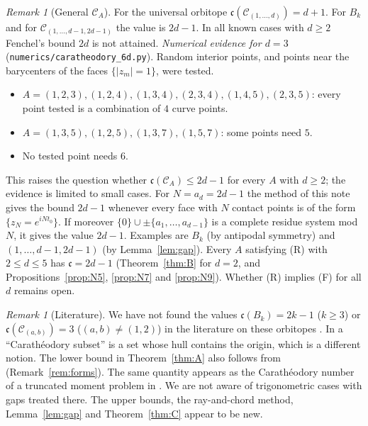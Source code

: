 \documentclass[11pt]{amsart}
\theoremstyle{remark}
\newtheorem{remark}[theorem]{Remark}
\newcommand{\cc}{\mathfrak{c}}
\begin{document}
\begin{remark}[General $\mathcal C_A$]
For the universal orbitope $\cc(\mathcal C_{(1,\dots,d)})=d+1$. For $B_k$ and for $\mathcal C_{(1,\dots,d-1,2d-1)}$ the value is $2d-1$. In all known cases with $d\ge2$ Fenchel's bound $2d$ is not attained.
\emph{Numerical evidence for $d=3$} (\texttt{numerics/caratheodory\_6d.py}). Random interior points, and points near the barycenters of the faces $\{|z_m|=1\}$, were tested.
\begin{itemize}
\item $A=(1,2,3),(1,2,4),(1,3,4),(2,3,4),(1,4,5),(2,3,5)$: every point tested is a combination of $4$ curve points.
\item $A=(1,3,5),(1,2,5),(1,3,7),(1,5,7)$: some points need $5$.
\item No tested point needs $6$.
\end{itemize}
This raises the question whether $\cc(\mathcal C_A)\le2d-1$ for every $A$ with $d\ge2$; the evidence is limited to small cases. For $N=a_d=2d-1$ the method of this note gives the bound $2d-1$ whenever every face with $N$ contact points is of the
form $\{z_N=e^{iN t_0}\}$. If moreover $\{0\}\cup\pm\{a_1,\dots,a_{d-1}\}$ is a complete residue system mod $N$, it gives the value $2d-1$. Examples are $B_k$ (by antipodal symmetry) and
$(1,\dots,d-1,2d-1)$ (by Lemma~\ref{lem:gap}). Every $A$ satisfying (R) with $2\le d\le5$ has $\cc=2d-1$ (Theorem~\ref{thm:B} for $d=2$, and
Propositions~\ref{prop:N5}, \ref{prop:N7} and \ref{prop:N9}). Whether (R) implies (F) for all $d$ remains open.
\end{remark}

\begin{remark}[Literature]
We have not found the values $\cc(B_k)=2k-1$ ($k\ge3$) or $\cc(\mathcal C_{(a,b)})=3$ ($(a,b)\ne(1,2)$) in the literature on these orbitopes
\cite{SSS,BN08,BLN,Vin,Smi,Sinn,BK,ABF}. In \cite{ABF} a ``Carath\'eodory subset'' is a set whose hull contains the origin, which is a different notion.
The lower bound in Theorem~\ref{thm:A} also follows from \cite{CR} (Remark~\ref{rem:forms}). The same quantity appears as the Carath\'eodory number of a
truncated moment problem in \cite{DS,DK}. We are not aware of trigonometric cases with gaps treated there. The upper bounds, the ray-and-chord method,
Lemma~\ref{lem:gap} and Theorem~\ref{thm:C} appear to be new.
\end{remark}
\end{document}
